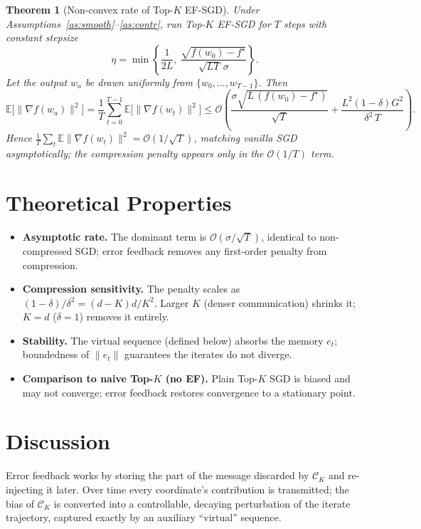 \documentclass[11pt]{article}
\theoremstyle{plain}
\newtheorem{theorem}{Theorem}
\begin{document}
\begin{theorem}[Non-convex rate of Top-$K$ EF-SGD]\label{thm:main}
Under Assumptions~\ref{as:smooth}--\ref{as:contr}, run Top-$K$ EF-SGD for $T$ steps with constant stepsize
\[
\eta=\min\!\left\{\frac{1}{2L},\ \frac{\sqrt{f(w_0)-f^\star}}{\sqrt{L T}\,\sigma}\right\}.
\]
Let the output $w_a$ be drawn uniformly from $\{w_0,\dots,w_{T-1}\}$. Then
\[
\mathbb{E}\big[\|\nabla f(w_a)\|^2\big]
= \frac{1}{T}\sum_{t=0}^{T-1}\mathbb{E}\big[\|\nabla f(w_t)\|^2\big]
\le \mathcal{O}\!\left(\frac{\sigma\sqrt{L\,(f(w_0)-f^\star)}}{\sqrt{T}}
+\frac{L^2(1-\delta)G^2}{\delta^2\,T}\right).
\]
Hence $\frac{1}{T}\sum_t\mathbb{E}\|\nabla f(w_t)\|^2 = \mathcal{O}(1/\sqrt{T})$, matching vanilla SGD asymptotically; the compression penalty appears only in the $\mathcal{O}(1/T)$ term.
\end{theorem}

\section*{Theoretical Properties}

\begin{itemize}
\item \textbf{Asymptotic rate.} The dominant term is $\mathcal{O}(\sigma/\sqrt{T})$, identical to non-compressed SGD; error feedback removes any first-order penalty from compression.
\item \textbf{Compression sensitivity.} The penalty scales as $(1-\delta)/\delta^2 = (d-K)d/K^2$. Larger $K$ (denser communication) shrinks it; $K=d$ ($\delta=1$) removes it entirely.
\item \textbf{Stability.} The virtual sequence (defined below) absorbs the memory $e_t$; boundedness of $\|e_t\|$ guarantees the iterates do not diverge.
\item \textbf{Comparison to naive Top-$K$ (no EF).} Plain Top-$K$ SGD is biased and may not converge; error feedback restores convergence to a stationary point.
\end{itemize}

\section*{Discussion}
Error feedback works by storing the part of the message discarded by $\mathcal{C}_K$ and re-injecting it later. Over time every coordinate's contribution is transmitted; the bias of $\mathcal{C}_K$ is converted into a controllable, decaying perturbation of the iterate trajectory, captured exactly by an auxiliary ``virtual'' sequence.
\end{document}
